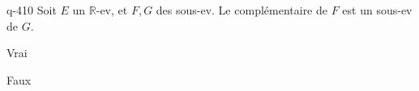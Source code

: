 \begin{truefalse}{q-410}
Soit $E$ un $\mathbb R$-ev, et $F,G$ des sous-ev. Le complémentaire de $F$ est un sous-ev de $G$.
\item Vrai
\item* Faux
\end{truefalse}

